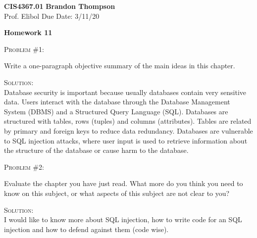 \documentclass[12pt]{article}
\newenvironment{problem}[1]
{\begin{mdframed}[linewidth=0.8pt]
        \textsc{Problem #1:}

}
    {\end{mdframed}}
\newenvironment{solution}
    {\textsc{Solution:}\\}
    {\newpage}%
\begin{document}
\noindent
\textbf{CIS4367.01} \hfill \textbf{Brandon Thompson} \\
\normalsize Prof. Elibol \hfill Due Date: 3/11/20 \\

\begin{center}
\textbf{Homework 11}
\end{center}
\begin{problem}{\#1}
		Write a one-paragraph objective summary of the main ideas in
		this chapter.
	\end{problem}
	\begin{solution}
		Database security is important because usually databases contain
		very sensitive data. Users interact with the database through
		the Database Management System (DBMS) and a Structured Query Language
		(SQL). Databases are structured with tables, rows (tuples) and columns
		(attributes). Tables are related by primary and foreign keys to reduce
		data redundancy.
		Databases are vulnerable to SQL injection attacks, where user input is
		used to retrieve information about the structure of the database or
		cause harm to the database.
	\end{solution}

	\begin{problem}{\#2}
		Evaluate the chapter you have just read. What more do you think you need to
		know on this subject, or what aspects of this subject are not clear to you?
	\end{problem}
	\begin{solution}
		I would like to know more about SQL injection, how to write code for an SQL
		injection and how to defend against them (code wise). 
	\end{solution}
\end{document}
